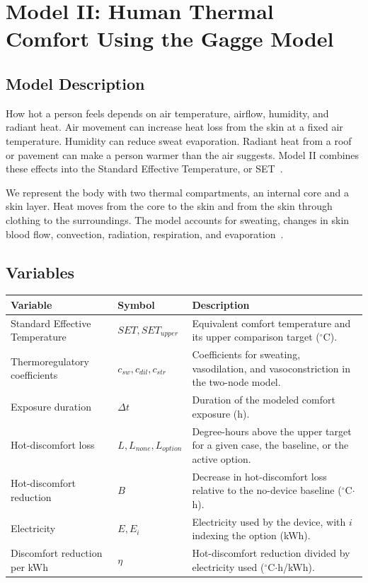 \section{Model II: Human Thermal Comfort Using the Gagge Model}
\subsection{Model Description}
 
How hot a person feels depends on air temperature, airflow, humidity, and radiant heat. Air movement can increase heat loss from the skin at a fixed air temperature. Humidity can reduce sweat evaporation. Radiant heat from a roof or pavement can make a person warmer than the air suggests. Model II combines these effects into the Standard Effective Temperature, or SET~\cite{ashrae_thermal_comfort_2025}.
 
We represent the body with two thermal compartments, an internal core and a skin layer. Heat moves from the core to the skin and from the skin through clothing to the surroundings. The model accounts for sweating, changes in skin blood flow, convection, radiation, respiration, and evaporation~\cite{ashrae_thermal_comfort_2025,comf_0112_set}.
 
\subsection{Variables}
\begin{table}[H]
  \centering
  \renewcommand{\arraystretch}{1.3}
  \begin{tabularx}{\textwidth}{p{}lY}
    \toprule
    \textbf{Variable} & \textbf{Symbol} & \textbf{Description} \\
    \midrule
    Standard Effective Temperature & $SET, SET_{upper}$ & Equivalent comfort temperature and its upper comparison target ($^\circ$C). \\
     Thermoregulatory coefficients & $c_{sw}, c_{dil}, c_{str}$ & Coefficients for sweating, vasodilation, and vasoconstriction in the two-node model. \\
    Exposure duration & $\Delta t$ & Duration of the modeled comfort exposure (h). \\
     Hot-discomfort loss & $L, L_{none}, L_{option}$ & Degree-hours above the upper target for a given case, the baseline, or the active option. \\
    Hot-discomfort reduction & $B$ & Decrease in hot-discomfort loss relative to the no-device baseline ($^\circ$C$\cdot$h). \\
     Electricity & $E, E_i$ & Electricity used by the device, with $i$ indexing the option (kWh). \\
    Discomfort reduction per kWh & $\eta$ & Hot-discomfort reduction divided by electricity used ($^\circ$C$\cdot$h/kWh). \\
    \bottomrule
  \end{tabularx}
\end{table}

